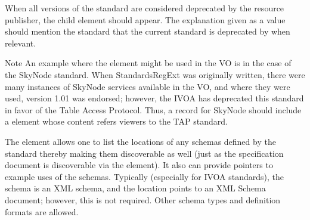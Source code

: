 \documentclass[11pt,a4paper]{ivoa}
\begin{document}

When all versions of the standard are considered deprecated by the
resource publisher, the  child element
should appear.  The explanation given as a value should mention the
standard that the current standard is deprecated by when relevant.

\begin{admonition}{Note}
An example where the  element
might be used in the VO is in the case of the SkyNode standard.
When StandardsRegExt was originally written, there were
many instances of SkyNode services available in the VO, and where
they were used, version 1.01 was endorsed; however, the IVOA has
deprecated this standard in favor of the Table Access
Protocol.  Thus, a
 record for
SkyNode should include a 
element whose content refers viewers to the TAP standard.
\end{admonition}

The  element allows one to
list the locations of any schemas defined by the standard thereby making
them discoverable as well (just as the specification document is
discoverable via the 
element).  It also can provide pointers to example uses of the
schemas.  Typically (especially for IVOA standards), the schema is an
XML schema, and the location points to an XML Schema document; however, this is not required.
Other schema types and definition formats are allowed.
\end{document}

